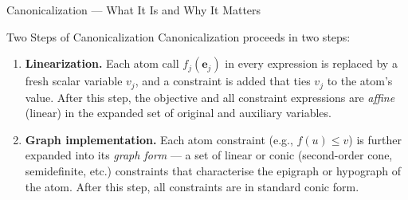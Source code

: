 \documentclass[aspectratio=169,10pt]{beamer}
\begin{document}
\begin{frame}[allowframebreaks]{Canonicalization --- What It Is and Why It Matters}
  \begin{block}{Two Steps of Canonicalization}
    Canonicalization proceeds in two steps:
    \begin{enumerate}
      \item \textbf{Linearization.}  Each atom call $f_j(\mathbf{e}_j)$
            in every expression is replaced by a fresh scalar variable
            $v_j$, and a constraint is added that ties $v_j$ to the
            atom's value.  After this step, the objective and all
            constraint expressions are \emph{affine} (linear) in the
            expanded set of original and auxiliary variables.
      \item \textbf{Graph implementation.}  Each atom constraint (e.g.,
            $f(u) \leq v$) is further expanded into its \emph{graph
            form} --- a set of linear or conic (second-order cone,
            semidefinite, etc.) constraints that characterise the
            epigraph or hypograph of the atom.  After this step, all
            constraints are in standard conic form.
    \end{enumerate}
  \end{block}

\end{frame}
\end{document}
